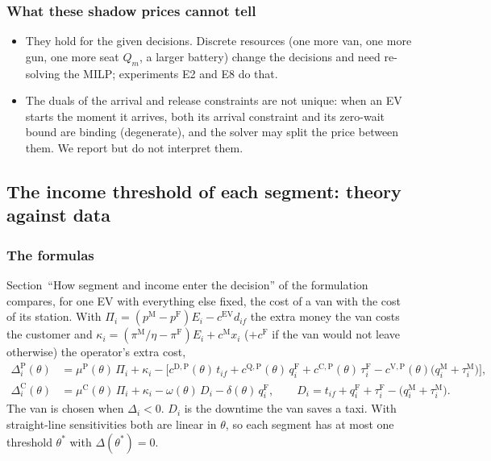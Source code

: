 \subsubsection{What these shadow prices cannot tell}
\begin{itemize}
  \item They hold for the given decisions. Discrete resources (one more van, one more gun, one more seat $Q_m$, a larger battery) change the decisions and need re-solving the MILP; experiments E2 and E8 do that.
  \item The duals of the arrival and release constraints are not unique: when an EV starts the moment it arrives, both its arrival constraint and its zero-wait bound are binding (degenerate), and the solver may split the price between them. We report but do not interpret them.
\end{itemize}


\subsection{The income threshold of each segment: theory against data}
\label{sec:threshold}

\subsubsection{The formulas}
Section~``How segment and income enter the decision'' of the formulation compares, for one EV with everything else fixed, the cost of a van with the cost of its station. With $\Pi_i=(p^{\mathrm M}-p^{\mathrm F})E_i-c^{\mathrm{EV}}d_{if}$ the extra money the van costs the customer and $\kappa_i=(\pi^{\mathrm M}/\eta-\pi^{\mathrm F})E_i+c^{\mathrm M}x_i$ ($+c^{\mathrm F}$ if the van would not leave otherwise) the operator's extra cost,
\begin{align*}
\Delta^{\mathrm P}_i(\theta)&=\mu^{\mathrm P}(\theta)\,\Pi_i+\kappa_i-\Big[c^{\mathrm D,\mathrm P}(\theta)\,t_{if}+c^{\mathrm Q,\mathrm P}(\theta)\,q^{\mathrm F}_i+c^{\mathrm C,\mathrm P}(\theta)\,\tau^{\mathrm F}_i-c^{\mathrm V,\mathrm P}(\theta)\big(q^{\mathrm M}_i+\tau^{\mathrm M}_i\big)\Big],\\
\Delta^{\mathrm C}_i(\theta)&=\mu^{\mathrm C}(\theta)\,\Pi_i+\kappa_i-\omega(\theta)\,D_i-\delta(\theta)\,q^{\mathrm F}_i,\qquad D_i=t_{if}+q^{\mathrm F}_i+\tau^{\mathrm F}_i-\big(q^{\mathrm M}_i+\tau^{\mathrm M}_i\big).
\end{align*}
The van is chosen when $\Delta_i<0$. $D_i$ is the downtime the van saves a taxi. With straight-line sensitivities both are linear in $\theta$, so each segment has at most one threshold $\theta^{*}$ with $\Delta(\theta^{*})=0$.

